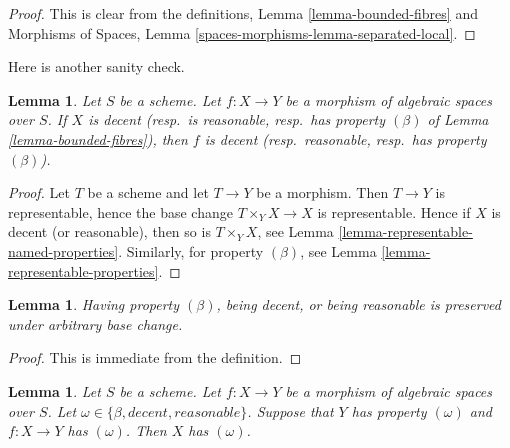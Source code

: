\documentclass{stacks-project}
\theoremstyle{plain}
\newtheorem{lemma}[subsection]{Lemma}
\theoremstyle{definition}
\theoremstyle{remark}
\numberwithin{equation}{subsection}
\begin{document}
\begin{proof}
This is clear from the definitions,
Lemma \ref{lemma-bounded-fibres}
and
Morphisms of Spaces,
Lemma \ref{spaces-morphisms-lemma-separated-local}.
\end{proof}

\noindent
Here is another sanity check.

\begin{lemma}
\label{lemma-property-for-morphism-out-of-property}
Let $S$ be a scheme. Let $f : X \to Y$ be a morphism of algebraic
spaces over $S$. If $X$ is decent (resp.\ is reasonable, resp.\ has property
$(\beta)$ of Lemma \ref{lemma-bounded-fibres}), then $f$ is
decent (resp.\ reasonable, resp.\ has property $(\beta)$).
\end{lemma}

\begin{proof}
Let $T$ be a scheme and let $T \to Y$ be a morphism. Then $T \to Y$
is representable, hence the base change $T \times_Y X \to X$ is representable.
Hence if $X$ is decent (or reasonable), then so is $T \times_Y X$, see
Lemma \ref{lemma-representable-named-properties}.
Similarly, for property $(\beta)$, see
Lemma \ref{lemma-representable-properties}.
\end{proof}

\begin{lemma}
\label{lemma-base-change-relative-conditions}
Having property $(\beta)$, being decent, or being reasonable
is preserved under arbitrary base change.
\end{lemma}

\begin{proof}
This is immediate from the definition.
\end{proof}

\begin{lemma}
\label{lemma-property-over-property}
Let $S$ be a scheme.
Let $f : X \to Y$ be a morphism of algebraic spaces over $S$.
Let $\omega \in \{\beta, decent, reasonable\}$.
Suppose that $Y$ has property $(\omega)$ and $f : X \to Y$ has $(\omega)$.
Then $X$ has $(\omega)$.
\end{lemma}
\end{document}
